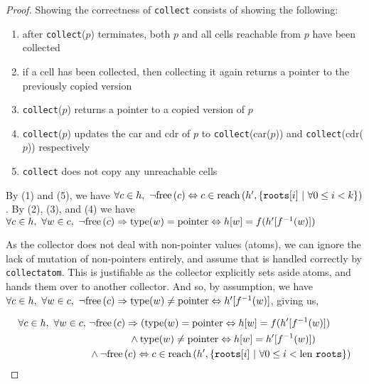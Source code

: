 \begin{proof}
  Showing the correctness of \texttt{collect} consists of showing the
  following:

  \begin{enumerate}
  \item after \texttt{collect}($p$) terminates, both $p$ and all cells
    reachable from $p$ have been collected

  \item if a cell has been collected, then collecting it again returns
    a pointer to the previously copied version

  \item \texttt{collect}($p$) returns a pointer to a copied version of
    $p$

  \item \texttt{collect}($p$) updates the car and cdr of $p$ to
    \texttt{collect}(car($p$)) and \texttt{collect}(cdr($p$))
    respectively

  \item \texttt{collect} does not copy any unreachable cells
  \end{enumerate}

  By (1) and (5), we have $\forall c \in h,\ \lnot\free{c} \iff c \in
  \reach{h'}{\{\mathtt{roots}[i]~|~\forall 0 \leq i < k\}}$. By (2),
  (3), and (4) we have $\forall c \in h,\ \forall w \in c,\ \lnot\mathrm{free}\left(c\right)
  \Rightarrow \mathrm{type}(w) = \mathrm{pointer} \Leftrightarrow h[w] =
  f(h'[f^{-1}(w)])$

  As the collector does not deal with non-pointer values (atoms), we
  can ignore the lack of mutation of non-pointers entirely, and assume
  that is handled correctly by \texttt{collectatom}. This is
  justifiable as the collector explicitly sets aside atoms, and hands
  them over to another collector. And so, by assumption, we have
  $\forall c \in h,\ \forall w \in c,\ \lnot\mathrm{free}\left(c\right) \Rightarrow
  \mathrm{type}(w) \neq \mathrm{pointer} \Leftrightarrow h'[f^{-1}(w)]$, giving
  us,

  \begin{align*}
    \forall c \in h,\ \forall w \in c,\ &\lnot\mathrm{free}\left(c\right) \Rightarrow
    (\mathrm{type}(w) = \mathrm{pointer} \Leftrightarrow h[w] = f(h'[f^{-1}(w)])\\
    &\quad\quad\quad\quad \land \mathrm{type}(w) \neq \mathrm{pointer}
    \Leftrightarrow h[w] = h'[f^{-1}(w)])\\
    &\land \lnot\mathrm{free}\left(c\right) \Leftrightarrow c \in \mathrm{reach}\left(h', \{\mathtt{roots}[i]~|~\forall
      0 \leq i < \mathrm{len}~\mathtt{roots}\}\right)
  \end{align*}
\end{proof}

